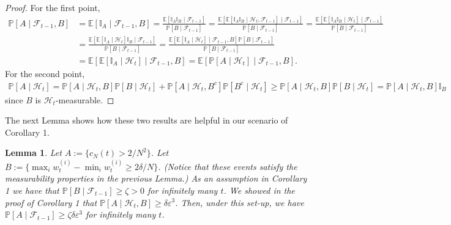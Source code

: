 \documentclass{article}
\newtheorem{lemma}{Lemma}
\newcommand{\Prob}{\mathbb{P}}
\newcommand{\E}{\mathbb{E}}
\newcommand{\1}[1]{\mathbb{I}_{#1}}
\begin{document}
\begin{proof}
For the first point,
\begin{align*}
\Prob[A \mid \mathcal{F}_{t-1}, B] 
&= \E[ \1{A} \mid \mathcal{F}_{t-1}, B]
= \frac{\E[ \1{A} \1{B} \mid \mathcal{F}_{t-1}]}{\Prob[B \mid \mathcal{F}_{t-1}]}
=\frac{\E[ \E[ \1{A} \1{B} \mid \mathcal{H}_t, \mathcal{F}_{t-1} ] \mid \mathcal{F}_{t-1}]}{\Prob[B \mid \mathcal{F}_{t-1}]}
=\frac{\E[ \E[ \1{A} \1{B} \mid \mathcal{H}_t ] \mid \mathcal{F}_{t-1}]}{\Prob[B \mid \mathcal{F}_{t-1}]}\\
&=\frac{\E[ \E[ \1{A} \mid \mathcal{H}_t ] \1{B} \mid \mathcal{F}_{t-1}]}{\Prob[B \mid \mathcal{F}_{t-1}]}
=\frac{\E[ \E[ \1{A} \mid \mathcal{H}_t ] \mid \mathcal{F}_{t-1}, B ] \Prob[B \mid \mathcal{F}_{t-1}]}{\Prob[B \mid \mathcal{F}_{t-1}]} \\
&=\E[ \E[ \1{A} \mid \mathcal{H}_t ] \mid \mathcal{F}_{t-1}, B ] 
=\E[ \Prob[ A \mid \mathcal{H}_t] \mid \mathcal{F}_{t-1}, B ].
\end{align*}
For the second point,
\begin{align*}
\Prob[A \mid \mathcal{H}_t] 
=  \Prob[ A \mid \mathcal{H}_t, B] \Prob[B \mid \mathcal{H}_t]
+ \Prob[ A \mid \mathcal{H}_t, B^c] \Prob[B^c \mid \mathcal{H}_t]
\geq  \Prob[ A \mid \mathcal{H}_t, B] \Prob[B \mid \mathcal{H}_t]
=  \Prob[ A \mid \mathcal{H}_t, B] \1{B}
\end{align*}
since $B$ is $\mathcal{H}_t$-measurable.
\end{proof}

The next Lemma shows how these two results are helpful in our scenario of Corollary 1.

\begin{lemma}
Let $A := \{ c_N(t) > 2/N^2 \}$. Let $B:= \{ \max_i w_t^{(i)} - \min_i w_t^{(i)} \geq 2\delta/N \}$. (Notice that these events satisfy the measurability properties in the previous Lemma.)
As an assumption in Corollary 1 we have that $\Prob[B \mid \mathcal{F}_{t-1}] \geq \zeta >0$ for infinitely many $t$.
We showed in the proof of Corollary 1 that $\Prob[A \mid \mathcal{H}_t, B] \geq \delta\varepsilon^3$.
Then, under this set-up, we have
$\Prob[A \mid \mathcal{F}_{t-1}] \geq \zeta\delta\varepsilon^3$ for infinitely many $t$.
\end{lemma}
\end{document}

